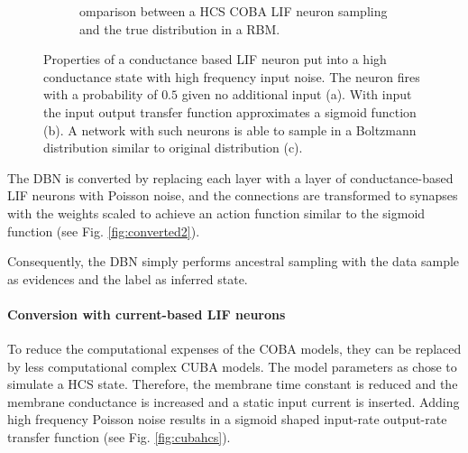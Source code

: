 \begin{figure}
\begin{subfigure}[t]{.5\textwidth}
  		\caption{omparison between a HCS COBA LIF neuron sampling and the true distribution in a RBM.}
  		\label{fig:cobahcs3}
	\end{subfigure}
	\caption[Properties of a conductance based LIF neuron in a high conductance state.]{Properties of a conductance based LIF neuron put into a high conductance state with high frequency input noise. The neuron fires with a probability of $0.5$ given no additional input (a). With input the input output transfer function approximates a sigmoid function (b). A network with such neurons is able to sample in a Boltzmann distribution similar to original distribution (c). }
	\label{fig:cobahcs}

\end{figure}
  
The DBN is converted by replacing each layer with a layer of conductance-based LIF neurons with Poisson noise, and the connections are transformed to synapses with the weights scaled to achieve an action function similar to the sigmoid function (see Fig. \ref{fig:converted2}).

Consequently, the DBN simply performs ancestral sampling with the data sample as evidences and the label as inferred state.   


\paragraph{Conversion with current-based LIF neurons} \label{c:convascuba}

To reduce the computational expenses of the COBA models, they can be replaced by less computational complex CUBA models.
The model parameters as chose to simulate a HCS state.
Therefore, the membrane time constant is reduced and the membrane conductance is increased and a static input current is inserted.  
Adding high frequency Poisson noise results in a sigmoid shaped input-rate output-rate transfer function (see Fig. \ref{fig:cubahcs}).

